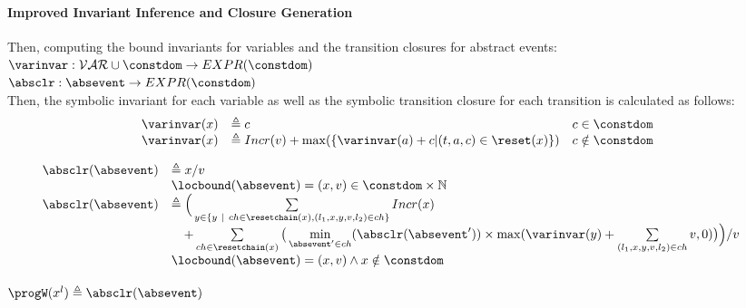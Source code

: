 \paragraph*{Improved Invariant Inference and Closure Generation}
Then, computing the bound invariants for variables and the transition closures for abstract events:
\\ 
$ \varinvar: \mathcal{VAR} \cup \constdom \to EXPR(\constdom)$
\\
$\absclr: \absevent \to EXPR(\constdom)$
\\
Then, the symbolic invariant for each variable 
as well as the symbolic transition closure for each transition is calculated as follows:
\[ 
\begin{array}{lll}
  \varinvar(x) & \triangleq c & c \in \constdom \\
  \varinvar(x) & \triangleq Incr(v) + \max(\{\varinvar(a) + c | (t, a, c) \in \reset(x)\}) & c \notin \constdom
\end{array}
\]
%
\begin{defn}
  \label{def:transition_closure}
\[ 
\begin{array}{lll}
  \absclr(\absevent) 
  & \triangleq x / v & \\ 
  & \locbound(\absevent) = (x, v) \in \constdom \times \mathbb{N} & \\
  \absclr(\absevent) 
  & \triangleq \Big(
    \sum\limits_{y \in \{ y ~|~ 
    ch \in \resetchain(x), (l_1, x, y, v, l_2) \in ch \} } Incr(x) & \\
    & \quad + 
  \sum\limits_{ch \in \resetchain(x)}
  \big( \min\limits_{\absevent' \in ch}({\absclr(\absevent')}) \times 
  \max(\varinvar(y) + \sum\limits_{(l_1, x, y, v, l_2) \in ch } v, 0)\big) \Big) / v & \\
  & \locbound(\absevent) = (x, v) \land x \notin \constdom & 
\end{array}
  \]
\end{defn}
$
\progW(x^l) 
  \triangleq \absclr(\absevent)
$
